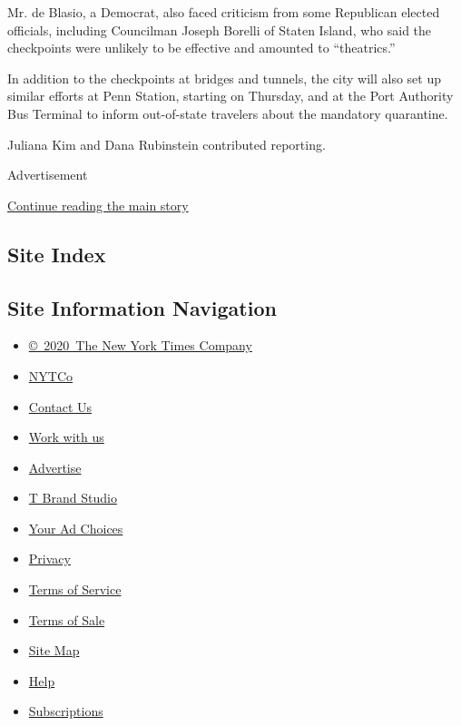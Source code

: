 Mr. de Blasio, a Democrat, also faced criticism from some Republican
elected officials, including Councilman Joseph Borelli of Staten Island,
who said the checkpoints were unlikely to be effective and amounted to
``theatrics.''

In addition to the checkpoints at bridges and tunnels, the city will
also set up similar efforts at Penn Station, starting on Thursday, and
at the Port Authority Bus Terminal to inform out-of-state travelers
about the mandatory quarantine.

Juliana Kim and Dana Rubinstein contributed reporting.

Advertisement

\protect\hyperlink{after-bottom}{Continue reading the main story}

\hypertarget{site-index}{%
\subsection{Site Index}\label{site-index}}

\hypertarget{site-information-navigation}{%
\subsection{Site Information
Navigation}\label{site-information-navigation}}

\begin{itemize}
\tightlist
\item
  \href{https://help.nytimes3xbfgragh.onion/hc/en-us/articles/115014792127-Copyright-notice}{©~2020~The
  New York Times Company}
\end{itemize}

\begin{itemize}
\tightlist
\item
  \href{https://www.nytco.com/}{NYTCo}
\item
  \href{https://help.nytimes3xbfgragh.onion/hc/en-us/articles/115015385887-Contact-Us}{Contact
  Us}
\item
  \href{https://www.nytco.com/careers/}{Work with us}
\item
  \href{https://nytmediakit.com/}{Advertise}
\item
  \href{http://www.tbrandstudio.com/}{T Brand Studio}
\item
  \href{https://www.nytimes3xbfgragh.onion/privacy/cookie-policy\#how-do-i-manage-trackers}{Your
  Ad Choices}
\item
  \href{https://www.nytimes3xbfgragh.onion/privacy}{Privacy}
\item
  \href{https://help.nytimes3xbfgragh.onion/hc/en-us/articles/115014893428-Terms-of-service}{Terms
  of Service}
\item
  \href{https://help.nytimes3xbfgragh.onion/hc/en-us/articles/115014893968-Terms-of-sale}{Terms
  of Sale}
\item
  \href{https://spiderbites.nytimes3xbfgragh.onion}{Site Map}
\item
  \href{https://help.nytimes3xbfgragh.onion/hc/en-us}{Help}
\item
  \href{https://www.nytimes3xbfgragh.onion/subscription?campaignId=37WXW}{Subscriptions}
\end{itemize}
